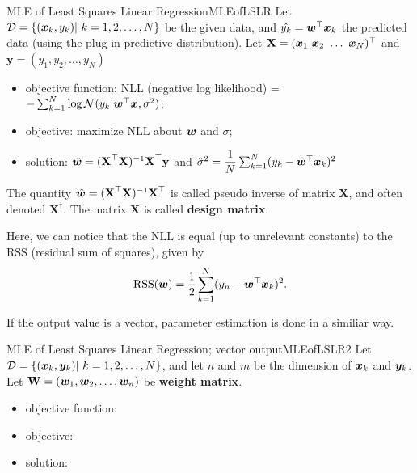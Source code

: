 \documentclass{article}
\begin{document}
            \begin{thm}{MLE of Least Squares Linear Regression}{MLEofLSLR}
                Let $\mathcal D=\{(\boldsymbol{x}_k, y_k)|\ k=1,2,\ldots,N\}$ be the given data, and $\hat{y_k}=\boldsymbol{w}^\top \boldsymbol{x}_k$ the predicted data (using the plug-in predictive distribution).
                Let $\textbf{X}=(\bs{x}_1 \ \bs{x}_2 \ \ldots \ \bs{x}_N)^\top$ and $\textbf{y}=(y_1,y_2,\ldots,y_N)$
                \begin{itemize}
                    \item objective function: NLL (negative log likelihood) = $-\sum_{k=1}^{N}\log{\mathcal N(y_k|\boldsymbol{w}^\top \boldsymbol{x}, \sigma^2)}$;
                    \item objective: maximize NLL about $\boldsymbol{w}$ and $\sigma$;
                    \item solution: $\hat{\boldsymbol{w}}=(\textbf{X}^{\top}\textbf{X})^{-1}\textbf{X}^{\top}\textbf{y}$ 
                    and $\hat{\sigma}^2=\dfrac{1}{N}\sum_{k=1}^{N}(y_k-\hat{\boldsymbol{w}}^{\top}\boldsymbol{x}_k)^2$
                \end{itemize}
                The quantity $\hat{\boldsymbol{w}}=(\textbf{X}^{\top}\textbf{X})^{-1}\textbf{X}^{\top}$
                is called pseudo inverse of matrix $\textbf{X}$, and often denoted $\textbf{X}^{\dagger}$.
                The matrix $\textbf{X}$ is called \textbf{design matrix}.
            \end{thm}
            Here, we can notice that the NLL is equal (up to unrelevant constants) to the RSS (residual sum of squares), given by
            \[
            \text{RSS}(\boldsymbol{w}) = \frac{1}{2} \sum_{k=1}^{N}(y_n - \boldsymbol{w}^{\top}\boldsymbol{x}_k)^2.
            \]

            If the output value is a vector, parameter estimation is done in a similiar way.

            \begin{thm}{MLE of Least Squares Linear Regression; vector output}{MLEofLSLR2}
                Let $\mathcal D=\{(\boldsymbol{x}_k, \boldsymbol{y}_k)|\ k = 1, 2, \ldots, N\}$, and let $n$ and $m$ be the dimension of $\boldsymbol{x}_k$ and $\boldsymbol{y}_k$.
                Let $\textbf{W} = (\boldsymbol{w}_1, \boldsymbol{w}_2, \ldots, \boldsymbol{w}_n)$ be \textbf{weight matrix}.
                \begin{itemize}
                    \item objective function:
                    \item objective:
                    \item solution:
                \end{itemize}
            \end{thm}
\end{document}
